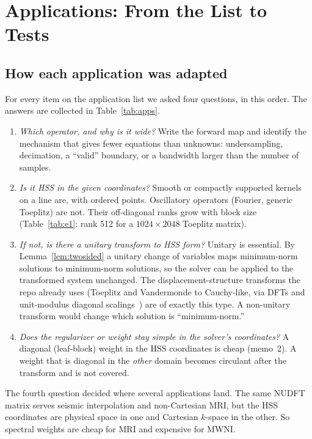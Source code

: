 \section{Applications: From the List to Tests}\label{sec:applications}

\subsection{How each application was adapted}\label{subsec:adapt}
For every item on the application list we asked four questions, in this order. The answers are
collected in Table~\ref{tab:apps}.
\begin{enumerate}[leftmargin=1.5em,itemsep=1pt]
\item \emph{Which operator, and why is it wide?} Write the forward map and identify the mechanism
that gives fewer equations than unknowns: undersampling, decimation, a ``valid'' boundary, or a
bandwidth larger than the number of samples.
\item \emph{Is it HSS in the given coordinates?} Smooth or compactly supported kernels on a line
are, with ordered points. Oscillatory operators (Fourier, generic Toeplitz) are not. Their
off-diagonal ranks grow with block size (Table~\ref{tab:e1}: rank 512 for a $1024\times2048$
Toeplitz matrix).
\item \emph{If not, is there a \emph{unitary} transform to HSS form?} Unitary is essential.
By Lemma~\ref{lem:twosided} a unitary change of variables maps minimum-norm solutions to
minimum-norm solutions, so the solver can be applied to the transformed system unchanged. The
displacement-structure transforms the repo already uses (Toeplitz and Vandermonde to
Cauchy-like, via DFTs and unit-modulus diagonal scalings~\cite{gko}) are of exactly this type. A
non-unitary transform would change which solution is ``minimum-norm.''
\item \emph{Does the regularizer or weight stay simple in the solver's coordinates?} A
diagonal (leaf-block) weight in the HSS coordinates is cheap (memo~2). A weight that is diagonal in
the \emph{other} domain becomes circulant after the transform and is not covered.
\end{enumerate}
The fourth question decided where several applications land. The same NUDFT matrix serves seismic
interpolation and non-Cartesian MRI, but the HSS coordinates are physical space in one and
Cartesian $k$-space in the other. So spectral weights are cheap for MRI and expensive for MWNI.

